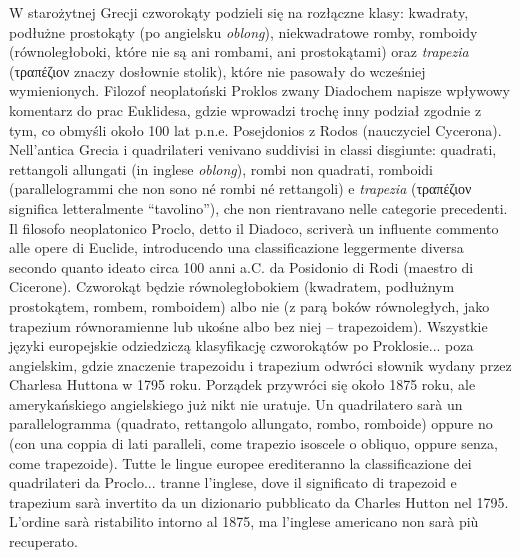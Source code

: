 W starożytnej Grecji czworokąty podzieli się na rozłączne klasy: kwadraty, podłużne prostokąty (po angielsku \emph{oblong}), niekwadratowe romby, romboidy (równoległoboki, które nie są ani rombami, ani prostokątami) oraz \emph{trapezia} (τραπέζιον znaczy dosłownie stolik), które nie pasowały do wcześniej wymienionych. %
Filozof neoplatoński Proklos zwany Diadochem napisze wpływowy komentarz do prac Euklidesa, gdzie wprowadzi trochę inny podział zgodnie z tym, co obmyśli około 100 lat p.n.e. Posejdonios z Rodos (nauczyciel Cycerona). %
Nell’antica Grecia i quadrilateri venivano suddivisi in classi disgiunte: quadrati, rettangoli allungati (in inglese \emph{oblong}), rombi non quadrati, romboidi (parallelogrammi che non sono né rombi né rettangoli) e \emph{trapezia} (τραπέζιον significa letteralmente ``tavolino''), che non rientravano nelle categorie precedenti. %
Il filosofo neoplatonico Proclo, detto il Diadoco, scriverà un influente commento alle opere di Euclide, introducendo una classificazione leggermente diversa secondo quanto ideato circa 100 anni a.C. da Posidonio di Rodi (maestro di Cicerone). %
Czworokąt będzie równoległobokiem (kwadratem, podłużnym prostokątem, rombem, romboidem) albo nie (z parą boków równoległych, jako trapezium równoramienne lub ukośne albo bez niej -- trapezoidem). %
Wszystkie języki europejskie odziedziczą klasyfikację czworokątów po Proklosie... poza angielskim, gdzie znaczenie trapezoidu i trapezium odwróci słownik wydany przez Charlesa Huttona w 1795 roku. %
Porządek przywróci się około 1875 roku, ale amerykańskiego angielskiego już nikt nie uratuje. %
Un quadrilatero sarà un parallelogramma (quadrato, rettangolo allungato, rombo, romboide) oppure no (con una coppia di lati paralleli, come trapezio isoscele o obliquo, oppure senza, come trapezoide). %
Tutte le lingue europee erediteranno la classificazione dei quadrilateri da Proclo... tranne l’inglese, dove il significato di trapezoid e trapezium sarà invertito da un dizionario pubblicato da Charles Hutton nel 1795. %
L’ordine sarà ristabilito intorno al 1875, ma l’inglese americano non sarà più recuperato. %

%
